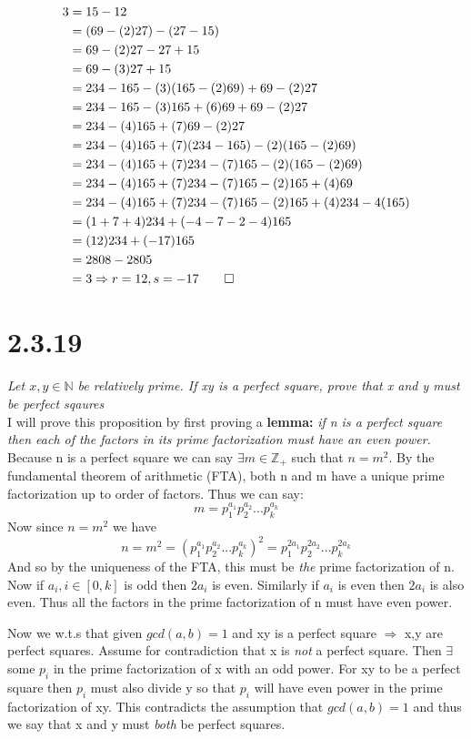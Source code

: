 \documentclass[a4paper, 11pt]{article}
\begin{document}
\begin{align*}
	3 &= 15 -12 \\ 
	&= (69-(2)27) - (27-15)\\
	&= 69-(2)27-27+15\\
	&= 69 - (3)27 + 15 \\ 
	&= 234-165-(3)(165-(2)69) + 69-(2)27 \\
	&=234-165-(3)165+(6)69+69-(2)27\\
	&= 234-(4)165+(7)69-(2)27\\
	&= 234-(4)165+(7)(234-165)-(2)(165-(2)69)\\
	&= 234-(4)165+(7)234-(7)165-(2)(165-(2)69)\\ 
	&= 234-(4)165+(7)234-(7)165-(2)165+(4)69 \\ 
	&= 234-(4)165+(7)234-(7)165-(2)165+(4)234-4(165)\\
	&= (1+7+4)234 + (-4-7-2-4)165 \\ 
	&=(12)234 + (-17)165 \\
	&= 2808-2805\\
	&= 3 \Rightarrow r=12, s=-17 \qed
\end{align*}

\section*{2.3.19}
\textit{Let $x,y \in \mathbb{N}$ be relatively prime. If xy is a perfect square, prove that x and y must be perfect sqaures} \\ 

I will prove this proposition by first proving a \textbf{lemma:} \textit{if n is a perfect square then each of the factors in its prime factorization must have an even power.} \\

Because n is a perfect square we can say $\exists m \in \mathbb{Z}_+$ such that $ n = m^2 $. By the fundamental theorem of arithmetic (FTA), both n and m have a unique prime factorization up to order of factors. Thus we can say: 
\begin{equation*}
	m = p_1^{a_1} p_2^{a_2} ... p_k^{a_k} 
\end{equation*}
Now since $n = m^2$ we have 
\begin{equation}
	n = m^2 = (p_1^{a_1} p_2^{a_2} ... p_k^{a_k})^2 = p_1^{2a_1} p_2^{2a_2} ... p_k^{2a_k}
\end{equation}
And so by the uniqueness of the FTA, this must be \textit{the} prime factorization of n. Now if $a_i, i \in [0, k]$ is odd then $2a_i$ is even. Similarly if $a_i$ is even then $2a_i$ is also even. Thus all the factors in the prime factorization of n must have even power. 

Now we w.t.s that given $gcd(a,b) = 1$ and xy is a perfect square $\Rightarrow$ x,y are perfect squares. Assume for contradiction that x is \textit{not} a perfect square. Then $\exists$ some $p_i$ in the prime factorization of x with an odd power. For xy to be a perfect square then $p_i$ must also divide y so that $p_i$ will have even power in the prime factorization of xy. This contradicts the assumption that $gcd(a,b) = 1$ and thus we say that x and y must \textit{both} be perfect squares. 
\end{document}
